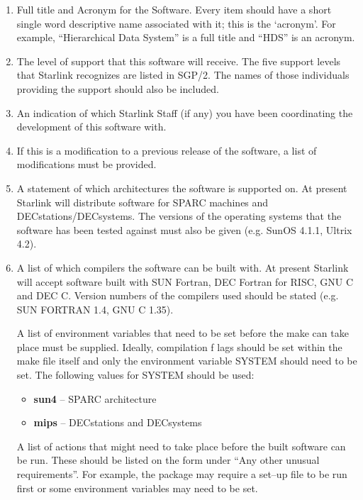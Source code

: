 \begin{enumerate}

\item Full title and Acronym for the Software. 
Every item should have a short single word descriptive name associated
with it; this is the `acronym'. 
For example, ``Hierarchical Data System'' is a full title and ``HDS'' is
an acronym.

\item The level of support that this software will receive.
The five support levels that Starlink recognizes are listed in SGP/2.
The names of those individuals providing the support should also be included.

\item An indication of which Starlink Staff (if any) you have been 
coordinating the development of this software with.

\item If this is a modification to a previous release of the software, a list
of modifications must be provided.

\item A statement of which architectures the software is supported on. At present
Starlink will distribute software for SPARC machines and
DECstations/DECsystems.  The versions of the operating systems that the software
has been tested against must also be given (e.g. SunOS 4.1.1,  Ultrix 4.2).

\item A list of which compilers the software can be built with. At present
Starlink will accept software built with SUN Fortran, DEC Fortran for RISC, 
GNU C and
DEC C. Version numbers of the compilers used should be stated (e.g. SUN FORTRAN
1.4, GNU C 1.35).

A list of environment variables that need to be set before the make can
take place must be supplied. Ideally, compilation f
lags should be set within the make file
itself and only the environment variable SYSTEM should need to be set.
The following values for SYSTEM should be used:

\begin{itemize}

\item {\bf sun4} -- SPARC architecture

\item {\bf mips} -- DECstations and DECsystems


\end{itemize}

A list of actions that might need to take place before the
built software can be run. These should be listed on the form under
``Any other unusual requirements''. For example, the package may require a
set--up file to be run first or some environment variables may need to
be set. 


\end{enumerate}
